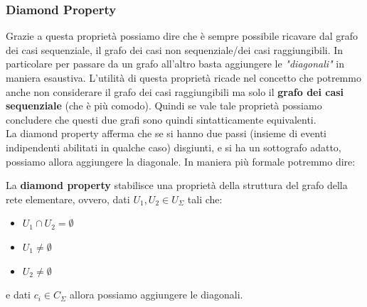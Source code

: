 \subsubsection{Diamond Property}
Grazie a questa proprietà possiamo dire che è sempre possibile ricavare dal grafo dei casi
sequenziale, il grafo dei casi non sequenziale/dei casi raggiungibili. In particolare  per passare da un grafo all'altro basta aggiungere le \textit{"diagonali"} in maniera esaustiva. 
 L'utilità di questa proprietà ricade nel concetto che potremmo anche non considerare il grafo dei casi
raggiungibili ma solo il \textbf{grafo dei casi sequenziale} (che è più comodo). Quindi se vale tale proprietà possiamo concludere che
questi due grafi sono quindi sintatticamente equivalenti.\\
La diamond property afferma che se si hanno due passi (insieme di eventi indipendenti abilitati in qualche caso)
disgiunti, e si ha un sottografo adatto, possiamo allora aggiungere la diagonale. In maniera più formale potremmo dire:
\begin{definizione}
  La \textbf{diamond property} stabilisce una proprietà della struttura del
  grafo della rete elementare, ovvero, dati $U_1, U_2\in U_\Sigma$ tali che:
  \begin{itemize}
    \item $U_1\cap U_2=\emptyset$
    \item $U_1\neq\emptyset$
    \item $U_2\neq\emptyset$
  \end{itemize}
  e dati $c_i\in C_\Sigma$ allora possiamo aggiungere le diagonali.
\end{definizione} \vspace{5mm} %
